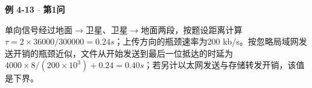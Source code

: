{\color{ink}\bfseries 例 4-13 \(\cdot \) 第1问}\par\vspace{1bp}单向信号经过地面\(\to \)卫星、卫星\(\to \)地面两段，按题设距离计算\(\tau =\allowbreak{}2\times 36000/\allowbreak{}300000=\allowbreak{}0.24 s\)；上传方向的瓶颈速率为200 kb/\allowbreak{}s。按忽略局域网发送开销的瓶颈近似，文件从开始发送到最后一位抵达的时延为\(4000\times 8/\allowbreak{}(200\times 10^{3})+\allowbreak{}0.24=\allowbreak{}0.40 s\)；若另计以太网发送与存储转发开销，该值是下界。
